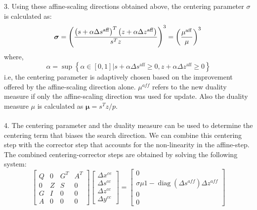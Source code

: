 3. Using these affine-scaling directions obtained above, the centering parameter $\sigma$ is calculated as:\\
\begin{equation}
\boldsymbol{\sigma}=\left(\frac{\left(s+\alpha \Delta s^{\mathrm{aff}}\right)^{T}\left(z+\alpha \Delta z^{\mathrm{aff}}\right)}{s^{T} z}\right)^{3}=\left(\frac{ \mu^{\mathrm{aff}}}{\mu}\right)^{3} 
\\
\end{equation}
\hspace{30pt} where, 
\begin{equation}
\alpha=\sup \left\{\alpha \in[0,1] | s+\alpha \Delta s^{\mathrm{aff}} \geq 0, z+\alpha \Delta z^{\mathrm{aff}} \geq 0\right\}
\end{equation}
i.e, the centering parameter is adaptively chosen based on the improvement offered by the affine-scaling direction alone. $\mu^{aff}$ refers to the new duality measure if only the affine-scaling direction was used for update. 
Also the duality measure $\mu$ is calculated as $\boldsymbol{\mu}=s^Tz/p$.\\ \\
4. The centering parameter and the duality measure can be used to determine the centering term that biases the search direction. We can combine this centering step with the corrector step that accounts for the non-linearity in the affine-step. The combined centering-corrector steps are obtained by solving the following system:
\begin{equation}
\left[\begin{array}{cccc}
Q & 0 & G^{T} & A^{T} \\
0 & Z & S & 0 \\
G & I & 0 & 0 \\
A & 0 & 0 & 0
\end{array}\right]\left[\begin{array}{c}
\Delta x^{c e} \\
\Delta s^{c c} \\
\Delta z^{c c} \\
\Delta y^{c c}
\end{array}\right]=\left[\begin{array}{c}
0 \\
\sigma \mu 1-\operatorname{diag}\left(\Delta s^{a f f}\right) \Delta z^{a f f} \\
0 \\
0
\end{array}\right]
\end{equation}\\ \\
